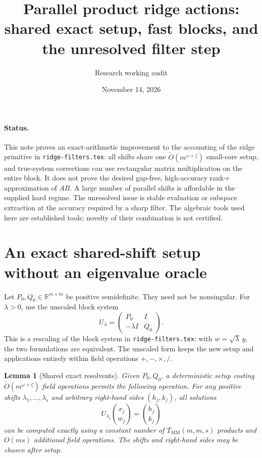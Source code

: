 \documentclass[11pt]{article}
\title{Parallel product ridge actions: shared exact setup, fast blocks, and the unresolved filter step}
\author{Research working audit}
\date{November 14, 2026}
\newtheorem{lemma}[theorem]{Lemma}
\newcommand{\R}{\mathbb R}
\newcommand{\MM}{T_{\mathrm{MM}}}
\newcommand{\tO}{\widetilde O}
\begin{document}
\maketitle

\paragraph{Status.}
This note proves an exact-arithmetic improvement to the accounting of the
ridge primitive in \texttt{ridge-filters.tex}: all shifts share one
\(\tO(m^{\omega+\zeta})\) small-core setup, and true-system
corrections can use rectangular matrix multiplication on the entire block.
It does not prove the desired gap-free, high-accuracy rank-\(r\)
approximation of \(AB\). A large number of parallel shifts is affordable
in the supplied hard regime. The unresolved issue is stable evaluation or
subspace extraction at the accuracy required by a sharp filter. The algebraic
tools used here are established tools; novelty of their combination is not
certified.

\section{An exact shared-shift setup without an eigenvalue oracle}
Let \(P_0,Q_0\in\R^{m\times m}\) be positive semidefinite. They
need not be nonsingular. For \(\lambda>0\), use the unscaled block
system
\begin{equation}\label{eq:unscaled}
 U_\lambda=
 \begin{pmatrix}P_0&I\\-\lambda I&Q_0\end{pmatrix}.
\end{equation}
This is a rescaling of the block system in \texttt{ridge-filters.tex}:
with \(w=\sqrt\lambda\,y\), the two formulations are equivalent.
The unscaled form keeps the new setup and applications entirely within
field operations \(+, -,\times,/\).

\begin{lemma}[Shared exact resolvents]\label{lem:shared}
Given \(P_0,Q_0\), a deterministic setup costing
\(\tO(m^{\omega+\zeta})\) field operations permits the following
operation. For any positive shifts \(\lambda_1,\ldots,\lambda_s\)
and arbitrary right-hand sides \((h_j,k_j)\), all solutions
\[
 U_{\lambda_j}\binom{x_j}{w_j}=\binom{h_j}{k_j}
\]
can be computed exactly using a constant number of
\(\MM(m,m,s)\) products and \(O(ms)\) additional field operations.
The shifts and right-hand sides may be chosen after setup.
\end{lemma}
\end{document}
